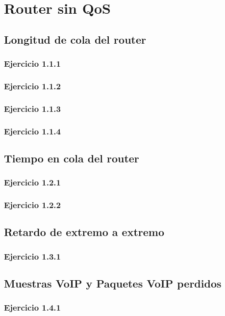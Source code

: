 \chapter{Router sin QoS}
\label{chap:sinqos}

\section{Longitud de cola del router}

\subsection{Ejercicio 1.1.1}

\subsection{Ejercicio 1.1.2}

\subsection{Ejercicio 1.1.3}

\subsection{Ejercicio 1.1.4}


\section{Tiempo en cola del router}

\subsection{Ejercicio 1.2.1}

\subsection{Ejercicio 1.2.2}



\section{Retardo de extremo a extremo}

\subsection{Ejercicio 1.3.1}



\section{Muestras VoIP y Paquetes VoIP perdidos}

\subsection{Ejercicio 1.4.1}